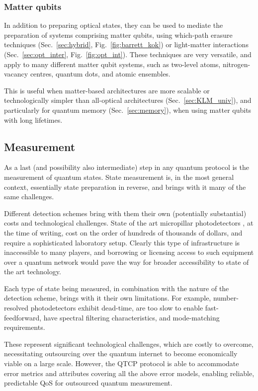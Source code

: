 \documentclass[aps,rmp,twocolumn,amsmath,amssymb,nofootinbib,superscriptaddress,longbibliography,floatfix]{revtex4-1}
\begin{document}
%
%

\subsubsection{Matter qubits}

In addition to preparing optical states, they can be used to mediate the preparation of systems comprising matter qubits, using which-path erasure techniques (Sec.~\ref{sec:hybrid}, Fig.~\ref{fig:barrett_kok}) or light-matter interactions (Sec.~\ref{sec:opt_inter}, Fig.~\ref{fig:opt_int}). These techniques are very versatile, and apply to many different matter qubit systems, such as two-level atoms, nitrogen-vacancy centres, quantum dots, and atomic ensembles.

This is useful when matter-based architectures are more scalable or technologically simpler than all-optical architectures (Sec.~\ref{sec:KLM_univ}), and particularly for quantum memory (Sec.~\ref{sec:memory}), when using matter qubits with long lifetimes.

%
%

\subsection{Measurement}

As a last (and possibility also intermediate) step in any quantum protocol is the measurement of quantum states. State measurement is, in the most general context, essentially state preparation in reverse, and brings with it many of the same challenges.

Different detection schemes bring with them their own (potentially substantial) costs and technological challenges. State of the art micropillar photodetectors \cite{???}, at the time of writing, cost on the order of hundreds of thousands of dollars, and require a sophisticated laboratory setup. Clearly this type of infrastructure is inaccessible to many players, and borrowing or licensing access to such equipment over a quantum network would pave the way for broader accessibility to state of the art technology.

Each type of state being measured, in combination with the nature of the detection scheme, brings with it their own limitations. For example, number-resolved photodetectors exhibit dead-time, are too slow to enable fast-feedforward, have spectral filtering characteristics, and mode-matching requirements. 

These represent significant technological challenges, which are costly to overcome, necessitating outsourcing over the quantum internet to become economically viable on a large scale. However, the QTCP protocol is able to accommodate error metrics and attributes covering all the above error models, enabling reliable, predictable QoS for outsourced quantum measurement.
\end{document}
